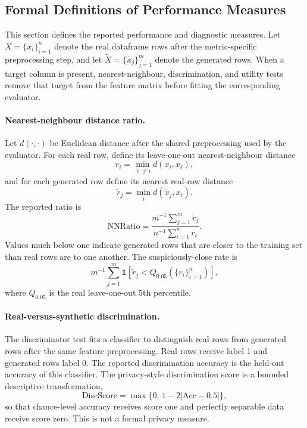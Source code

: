 

\subsection{Formal Definitions of Performance Measures}
\label{app:measure-definitions}

This section defines the reported performance and diagnostic measures. Let
$X=\{x_i\}_{i=1}^n$ denote the real dataframe rows after the metric-specific
preprocessing step, and let $\widetilde{X}=\{\widetilde{x}_j\}_{j=1}^m$ denote
the generated rows. When a target column is present, nearest-neighbour,
discrimination, and utility tests remove that target from the feature matrix
before fitting the corresponding evaluator.

\paragraph{Nearest-neighbour distance ratio.}
Let $d(\cdot,\cdot)$ be Euclidean distance after the shared preprocessing used
by the evaluator. For each real row, define its leave-one-out nearest-neighbour
distance
\[
  r_i = \min_{\ell\ne i} d(x_i,x_\ell),
\]
and for each generated row define its nearest real-row distance
\[
  \widetilde{r}_j = \min_i d(\widetilde{x}_j,x_i).
\]
The reported ratio is
\[
  \mathrm{NNRatio}
  =
  \frac{m^{-1}\sum_{j=1}^m \widetilde{r}_j}
       {n^{-1}\sum_{i=1}^n r_i}.
\]
Values much below one indicate generated rows that are closer to the training
set than real rows are to one another. The suspiciously-close rate is
\[
  m^{-1}\sum_{j=1}^m
  \mathbf{1}\!\left[
    \widetilde{r}_j < Q_{0.05}(\{r_i\}_{i=1}^n)
  \right],
\]
where $Q_{0.05}$ is the real leave-one-out 5th percentile.

\paragraph{Real-versus-synthetic discrimination.}
The discriminator test fits a classifier to distinguish real rows from
generated rows after the same feature preprocessing. Real rows receive label
1 and generated rows label 0. The reported discrimination accuracy is the
held-out accuracy of this classifier. The privacy-style discrimination score is
a bounded descriptive transformation,
\[
  \mathrm{DiscScore}
  =
  \max\{0,\,1-2|\mathrm{Acc}-0.5|\},
\]
so that chance-level accuracy receives score one and perfectly separable data
receive score zero. This is not a formal privacy measure.

